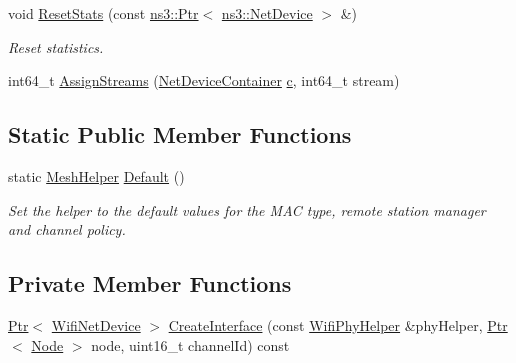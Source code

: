 \begin{DoxyCompactItemize}
void \hyperlink{classns3_1_1MeshHelper_a9dd632081628b4dacc01930faa2ca838}{Reset\+Stats} (const \hyperlink{classns3_1_1Ptr}{ns3\+::\+Ptr}$<$ \hyperlink{classns3_1_1NetDevice}{ns3\+::\+Net\+Device} $>$ \&)
\begin{DoxyCompactList}\small\item\em Reset statistics. \end{DoxyCompactList}\item 
int64\+\_\+t \hyperlink{classns3_1_1MeshHelper_a93e9c88a375a86c621a494aafe68882e}{Assign\+Streams} (\hyperlink{classns3_1_1NetDeviceContainer}{Net\+Device\+Container} \hyperlink{mmwave_2model_2fading-traces_2fading__trace__generator_8m_ae0323a9039add2978bf5b49550572c7c}{c}, int64\+\_\+t stream)
\end{DoxyCompactItemize}
\subsection*{Static Public Member Functions}
\begin{DoxyCompactItemize}
\item 
static \hyperlink{classns3_1_1MeshHelper}{Mesh\+Helper} \hyperlink{classns3_1_1MeshHelper_aa5feccef3e3bb467f31132227f887c97}{Default} ()
\begin{DoxyCompactList}\small\item\em Set the helper to the default values for the M\+AC type, remote station manager and channel policy. \end{DoxyCompactList}\end{DoxyCompactItemize}
\subsection*{Private Member Functions}
\begin{DoxyCompactItemize}
\item 
\hyperlink{classns3_1_1Ptr}{Ptr}$<$ \hyperlink{classns3_1_1WifiNetDevice}{Wifi\+Net\+Device} $>$ \hyperlink{classns3_1_1MeshHelper_accb4af36cfa3563ff53aa8a3dc085d94}{Create\+Interface} (const \hyperlink{classns3_1_1WifiPhyHelper}{Wifi\+Phy\+Helper} \&phy\+Helper, \hyperlink{classns3_1_1Ptr}{Ptr}$<$ \hyperlink{classns3_1_1Node}{Node} $>$ node, uint16\+\_\+t channel\+Id) const 
\end{DoxyCompactItemize}
